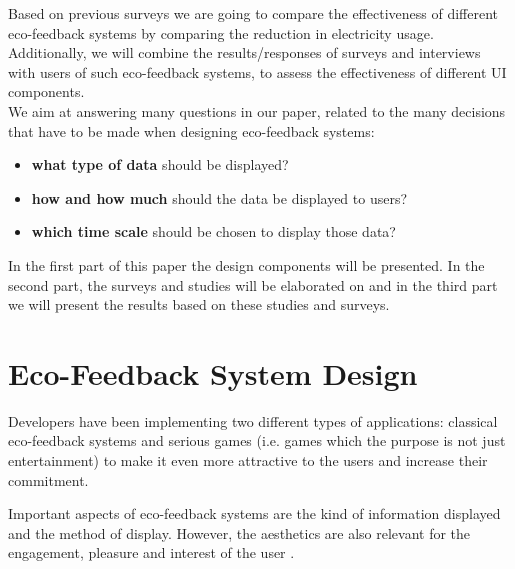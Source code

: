 \documentclass[journal]{vgtc}                %
\begin{document}
Based on previous surveys we are going to compare the effectiveness of different eco-feedback systems by comparing the reduction in electricity usage. Additionally, we will combine the results/responses of surveys and interviews with users of such eco-feedback systems, to assess the effectiveness of different UI components. \\

We aim at answering many questions in our paper, related to the many decisions that have to be made when designing eco-feedback systems:
\begin{itemize}
\item \textbf{what type of data} should be displayed? 
\item \textbf{how and how much} should the data be displayed to users? 
\item \textbf{which time scale} should be chosen to display those data? 
\end{itemize}

In the first part of this paper the design components will be presented. In the second part, the surveys and studies will be elaborated on and in the third part we will present the results based on these studies and surveys. %


\section{Eco-Feedback System Design}
Developers have been implementing two different types of applications: classical eco-feedback systems and serious games (i.e. games which the purpose is not just entertainment)
to make it even more attractive to the users and increase their commitment.

Important aspects of eco-feedback systems are the kind of information displayed and the method of display. However, the aesthetics are also relevant for the engagement, pleasure and interest of the user \cite{bartram2015design}.
\end{document}
